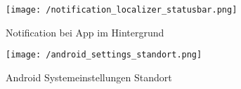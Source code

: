 \bigskip

\begin{figure}[H]
\hspace{15mm}
\begin{minipage}[hbt]{5cm}
	\centering
	\texttt{[image: /notification\_localizer\_statusbar.png]}
	\caption[Lokalisierung: deaktivierte Provider - Notification bei geschlossener App]{Notification bei App im Hintergrund}
	\label{Bild1}
\end{minipage}
\hfill
\begin{minipage}[hbt]{5cm}
	\centering
	\texttt{[image: /android\_settings\_standort.png]}
	\caption[Lokalisierung: Android Standorteinstellungen]{Android Systemeinstellungen Standort}
	\label{Bild2}
\end{minipage}
\hspace{15mm}
\end{figure}

